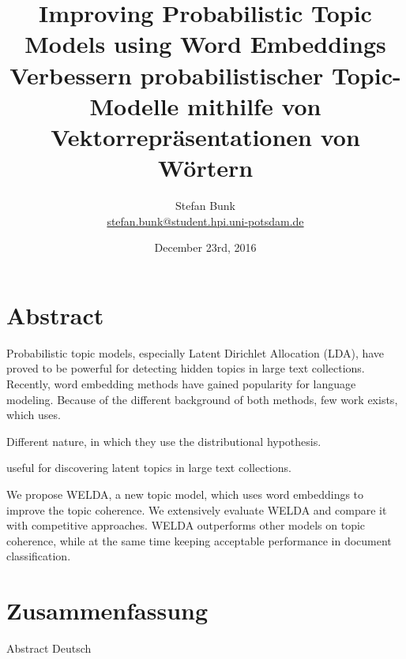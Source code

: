 \documentclass[
        a4paper,
        titlepage,
        twoside,
        parskip,
        numbers=noenddot
        ]{scrbook}
\title{Improving Probabilistic Topic Models using Word Embeddings
\\ \bigskip
\large{Verbessern probabilistischer Topic-Modelle mithilfe von Vektorrepräsentationen von Wörtern}}
\author{Stefan Bunk\\{\small{\url{stefan.bunk@student.hpi.uni-potsdam.de}}}}
\date{December 23rd, 2016}
\theoremstyle{break}
\begin{document}
\maketitle
\cleardoublepage

\makeatletter
\@openrightfalse

\chapter*{Abstract}
Probabilistic topic models, especially Latent Dirichlet Allocation (LDA), have proved to be powerful for detecting hidden topics in large text collections.
Recently, word embedding methods have gained popularity for language modeling.
Because of the different background of both methods, few work exists, which uses.

Different nature, in which they use the distributional hypothesis.

useful for discovering latent topics in large text collections.

We propose WELDA, a new topic model, which uses word embeddings to improve the topic coherence.
We extensively evaluate WELDA and compare it with competitive approaches.
WELDA outperforms other models on topic coherence, while at the same time keeping acceptable performance in document classification.


\chapter*{Zusammenfassung}
Abstract Deutsch

\@openrighttrue
\makeatother

\setcounter{secnumdepth}{4}
\setcounter{tocdepth}{4}
\tableofcontents
\end{document}
